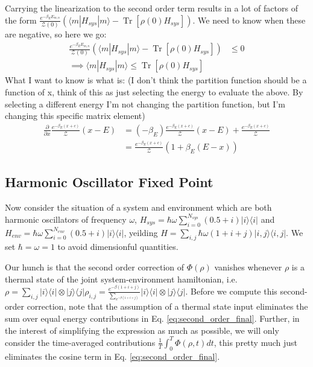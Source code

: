\documentclass{article}
\newcommand{\ket}[1]{|#1\rangle}
\newcommand{\bra}[1]{\langle #1|}
\newcommand{\ketbra}[2]{| #1\rangle\! \langle #2|}
\newcommand{\parens}[1]{\left( #1 \right)}
\newcommand{\brackets}[1]{\left[ #1 \right]}
\DeclareMathOperator{\Tr}{Tr}
\newcommand{\trace}[1]{\Tr \brackets{ #1 }}
\newcommand{\partfun}{\mathcal{Z}}
\begin{document}
Carrying the linearization to the second order term results in a lot of factors of the form $\frac{e^{-\beta_E E_{m,n}}}{\partfun(0)} (\bra{m} H_{sys} \ket{m} - \trace{\rho(0) H_{sys}})$. We need to know when these are negative, so here we go:
\begin{align}
    \frac{e^{-\beta_E E_{m,n}}}{\partfun(0)} \parens{\bra{m} H_{sys} \ket{m} - \trace{\rho(0) H_{sys}}} & \leq 0 \\
    \implies \bra{m} H_{sys} \ket{m} \leq \trace{\rho(0) H_{sys}}
\end{align}
What I want to know is what is: (I don't think the partition function should be a function of x, think of this as just selecting the energy to evaluate the above. By selecting a different energy I'm not changing the partition function, but I'm changing this specific matrix element)
\begin{align}
    \frac{\partial}{\partial x} \frac{e^{-\beta_E (x + c)}}{\partfun}(x - E) &= (-\beta_E) \frac{e^{-\beta_E (x + c)}}{\partfun}(x - E) + \frac{e^{-\beta_E (x + c)}}{\partfun} \\
    &= \frac{e^{-\beta_E (x + c)}}{\partfun} \parens{1 + \beta_E (E - x)}
\end{align}



\subsection{Harmonic Oscillator Fixed Point}
Now consider the situation of a system and environment which are both harmonic oscillators of frequency $\omega$, $H_{sys} = \hbar \omega \sum_{i=0}^{N_{sys}} (0.5 + i) \ketbra{i}{i}$ and $H_{env} = \hbar \omega \sum_{i=0}^{N_{env}} (0.5 + i) \ketbra{i}{i}$, yeilding $H = \sum_{i,j} \hbar \omega (1 + i + j) \ketbra{i,j}{i,j}$. We set $\hbar = \omega = 1$ to avoid dimensionful quantities. 

Our hunch is that the second order correction of $\Phi(\rho)$ vanishes whenever $\rho$ is a thermal state of the joint system-environment hamiltonian, i.e. $\rho = \sum_{i,j} \ketbra{i}{i} \otimes \ketbra{j}{j}\rho_{i,j} = \frac{e^{-\beta (1 + i + j)}}{\sum_{e^{-\beta(1+  i + j)}}} \ketbra{i}{i} \otimes \ketbra{j}{j}$. Before we compute this second-order correction, note that the assumption of a thermal state input eliminates the sum over equal energy contributions in Eq. \eqref{eq:second_order_final}. Further, in the interest of simplifying the expression as much as possible, we will only consider the time-averaged contributions $\frac{1}{T} \int_0^T \Phi(\rho, t) dt$, this pretty much just eliminates the cosine term in Eq. \eqref{eq:second_order_final}.
\end{document}
